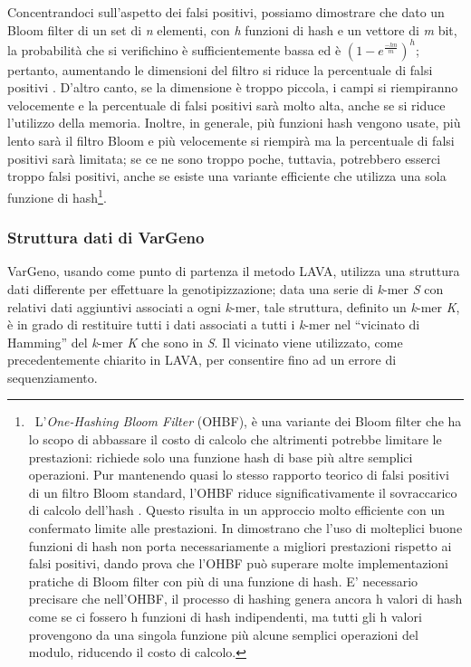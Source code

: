 \documentclass[../main.tex]{subfiles}
\begin{document}
Concentrandoci sull'aspetto dei falsi positivi, possiamo dimostrare che dato un Bloom filter di un set di \textit{n} elementi, con \textit{h} funzioni di hash e un vettore di \textit{m} bit, la probabilità che si verifichino è sufficientemente bassa ed è $(1 - e^{\frac{-hn}{m}})^{h} $; pertanto, aumentando le dimensioni del filtro si riduce la percentuale di falsi positivi \cite{bernardini2019malva} \cite{compressedbloomfilter}. D'altro canto, se la dimensione è troppo piccola, i campi si riempiranno velocemente e la percentuale di falsi positivi sarà molto alta, anche se si riduce l'utilizzo della memoria. Inoltre, in generale, più funzioni hash vengono usate, più lento sarà il filtro Bloom e più velocemente si riempirà ma la percentuale di falsi positivi sarà limitata; se ce ne sono troppo poche, tuttavia, potrebbero esserci troppo falsi positivi, anche se esiste una variante efficiente che utilizza una sola funzione di hash\footnote{ \label{nota:OHBF} \ L'\textit{One-Hashing Bloom Filter} (OHBF), è una variante dei Bloom filter che ha lo scopo di abbassare il costo di calcolo che altrimenti potrebbe limitare le prestazioni: richiede solo una funzione hash di base più altre semplici operazioni. Pur mantenendo quasi lo stesso rapporto teorico di falsi positivi di un filtro Bloom standard, l'OHBF riduce significativamente il sovraccarico di calcolo dell'hash \cite{bloomonehash}. Questo risulta in un approccio molto efficiente con un confermato limite alle prestazioni. In \cite{bloomonehash} dimostrano che l'uso di molteplici buone funzioni di hash non porta necessariamente a migliori prestazioni rispetto ai falsi positivi, dando prova che l'OHBF può superare molte implementazioni pratiche di Bloom filter con più di una funzione di hash. E' necessario precisare che nell'OHBF, il processo di hashing genera ancora h valori di hash come se ci fossero h funzioni di hash indipendenti, ma tutti gli h valori provengono da una singola funzione più alcune semplici operazioni del modulo, riducendo il costo di calcolo.}.

\subsubsection{Struttura dati di VarGeno}
VarGeno, usando come punto di partenza il metodo LAVA, utilizza una struttura dati differente per effettuare la genotipizzazione; data una serie di \textit{k}-mer \textit{S} con relativi dati aggiuntivi associati a ogni \textit{k}-mer, tale struttura, definito un \textit{k}-mer \textit{K}, è in grado di restituire tutti i dati associati a tutti i \textit{k}-mer nel “vicinato di Hamming” del \textit{k}-mer \textit{K} che sono in \textit{S}. Il vicinato viene utilizzato, come precedentemente chiarito in LAVA, per consentire fino ad un errore di sequenziamento.
\end{document}
